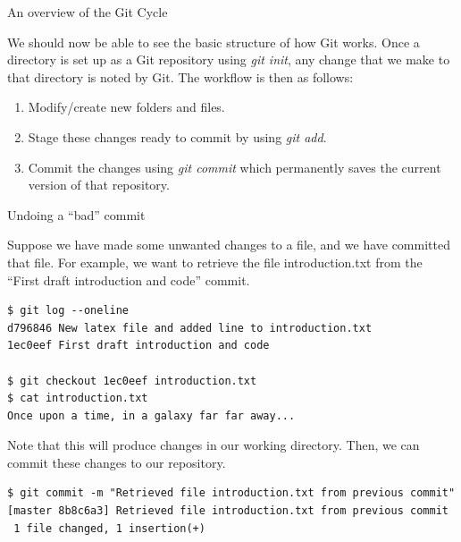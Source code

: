 \documentclass[10pt]{beamer}
\begin{document}
\begin{frame}[fragile]{An overview of the Git Cycle}


We should now be able to see the basic structure of how Git works. Once a directory is set up as a Git repository using \emph{git init}, any change that we make to that directory is noted by Git. The workflow is then as follows:
\begin{enumerate}
\item
Modify/create new folders and files.
\item
Stage these changes ready to commit by using \emph{git add}.
\item
Commit the changes using \emph{git commit} which permanently saves the current version of that repository.
\end{enumerate}

\end{frame}


\begin{frame}[fragile]{Undoing a ``bad'' commit}

Suppose we have made some unwanted changes to a file, and we have committed that file. For example, we want to retrieve the file introduction.txt from the ``First draft introduction and code'' commit.

\begin{lstlisting}
$ git log --oneline
d796846	New latex file and added line to introduction.txt
1ec0eef	First draft introduction and code

$ git checkout 1ec0eef introduction.txt
$ cat introduction.txt
Once upon a time, in a galaxy far far away...
\end{lstlisting}

Note that this will produce changes in our working directory. Then, we can commit these changes to our repository.

\begin{lstlisting}
$ git commit -m "Retrieved file introduction.txt from previous commit"
[master 8b8c6a3] Retrieved file introduction.txt from previous commit
 1 file changed, 1 insertion(+)
\end{lstlisting}

\end{frame}
\end{document}
